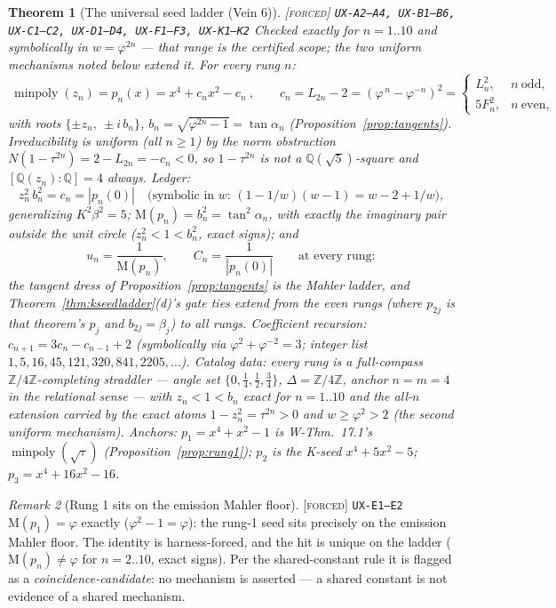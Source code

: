 \documentclass[11pt]{article}
\newcommand{\tagF}{\textcolor{cF}{\textsc{[forced]}}}
\newcommand{\hx}[1]{\textcolor{cC}{\footnotesize\texttt{#1}}}
\newcommand{\Q}{\mathbb{Q}}
\newcommand{\Z}{\mathbb{Z}}
\newcommand{\gp}{\varphi}
\newcommand{\M}{\mathrm{M}}
\theoremstyle{plain}
\newtheorem{theorem}{Theorem}[section]
\theoremstyle{definition}
\theoremstyle{remark}
\newtheorem{remark}[theorem]{Remark}
\begin{document}
\begin{theorem}[The universal seed ladder (Vein 6)]\label{thm:seedladder}\tagF{} \hx{UX-A2--A4, UX-B1--B6, UX-C1--C2, UX-D1--D4, UX-F1--F3, UX-K1--K2}
Checked exactly for $n=1..10$ and symbolically in $w=\gp^{2n}$ --- that
range is the certified scope; the two uniform mechanisms noted below extend
it. For every rung $n$:
\[
\boxed{\ \operatorname{minpoly}(z_n)=p_n(x)=x^4+c_nx^2-c_n\ },
\qquad
c_n=L_{2n}-2=(\gp^{\,n}-\gp^{-n})^2
=\begin{cases}L_n^2,&n\ \text{odd},\\[2pt]5F_n^2,&n\ \text{even},\end{cases}
\]
with roots $\{\pm z_n,\ \pm i\,b_n\}$, $b_n=\sqrt{\gp^{2n}-1}=\tan\alpha_n$
(Proposition~\ref{prop:tangents}). Irreducibility is uniform (all $n\ge1$)
by the norm obstruction $N(1-\tau^{2n})=2-L_{2n}=-c_n<0$, so $1-\tau^{2n}$
is not a $\Q(\sqrt5)$-square and $[\Q(z_n):\Q]=4$ always. Ledger:
\[
z_n^2\,b_n^2=c_n=|p_n(0)|
\quad\text{(symbolic in $w$: $(1-1/w)(w-1)=w-2+1/w$)},
\]
generalizing $K^2\beta^2=5$; $\M(p_n)=b_n^2=\tan^2\alpha_n$, with exactly
the imaginary pair outside the unit circle ($z_n^2<1<b_n^2$, exact signs);
and
\[
u_n=\frac1{\M(p_n)},\qquad C_n=\frac1{|p_n(0)|}\qquad\text{at every rung}:
\]
\emph{the tangent dress of Proposition~\ref{prop:tangents} is the Mahler
ladder}, and Theorem~\ref{thm:kseedladder}(d)'s gate ties extend from the
even rungs (where $p_{2j}$ is that theorem's $p_j$ and $b_{2j}=\beta_j$) to
all rungs. Coefficient recursion: $c_{n+1}=3c_n-c_{n-1}+2$ (symbolically
via $\gp^2+\gp^{-2}=3$; integer list $1,5,16,45,121,320,841,2205,\ldots$).
Catalog data: every rung is a full-compass $\Z/4\Z$-completing straddler
--- angle set $\{0,\tfrac14,\tfrac12,\tfrac34\}$, $\Delta=\Z/4\Z$, anchor
$n=m=4$ in the relational sense --- with $z_n<1<b_n$ exact for $n=1..10$
and the all-$n$ extension carried by the exact atoms $1-z_n^2=\tau^{2n}>0$
and $w\ge\gp^2>2$ (the second uniform mechanism). Anchors: $p_1=x^4+x^2-1$
is W-Thm.\ 17.1's $\operatorname{minpoly}(\sqrt\tau)$
(Proposition~\ref{prop:rung1}); $p_2$ is the K-seed $x^4+5x^2-5$;
$p_3=x^4+16x^2-16$.
\end{theorem}

\begin{remark}[Rung 1 sits on the emission Mahler floor]\label{rem:mahlerfloor}\tagF{} \hx{UX-E1--E2}
$\M(p_1)=\gp$ exactly ($\gp^2-1=\gp$): the rung-1 seed sits precisely on
the emission Mahler floor. The identity is harness-forced, and the hit is
unique on the ladder ($\M(p_n)\neq\gp$ for $n=2..10$, exact signs). Per the
shared-constant rule it is flagged as a \emph{coincidence-candidate}: no
mechanism is asserted --- a shared constant is not evidence of a shared
mechanism.
\end{remark}
\end{document}
